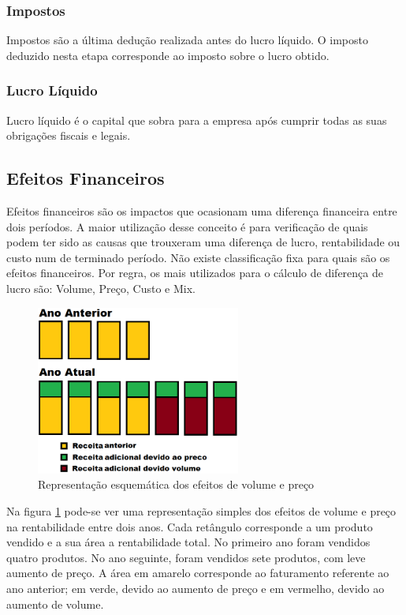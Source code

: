 \documentclass[12pt]{article}
\begin{document}
\subsubsection{Impostos}

	Impostos são a última dedução realizada antes do lucro líquido. O imposto deduzido nesta etapa corresponde ao imposto sobre o lucro obtido.

\subsubsection{Lucro Líquido}

	Lucro líquido é o capital que sobra para a empresa após cumprir todas as suas obrigações fiscais e legais.

\subsection{Efeitos Financeiros}

	Efeitos financeiros são os impactos que ocasionam uma diferença financeira entre dois períodos. A maior utilização desse conceito é para verificação de quais podem ter sido as causas que trouxeram uma diferença de lucro, rentabilidade ou custo num de terminado período. Não existe classificação fixa para quais são os efeitos financeiros. Por regra, os mais utilizados para o cálculo de diferença de lucro são: Volume, Preço, Custo e Mix.

\begin{figure}[h!]
	\centering
	\includegraphics[width=0.6\textwidth]{img/effects.png}
	\caption{Representação esquemática dos efeitos de volume e preço}
	\label{fig:effects}
\end{figure}

	Na figura \ref{fig:effects} pode-se ver uma representação simples dos efeitos de volume e preço na rentabilidade entre dois anos. Cada retângulo corresponde a um produto vendido e a sua área a rentabilidade total. No primeiro ano foram vendidos quatro produtos. No ano seguinte, foram vendidos sete produtos, com leve aumento de preço. A área em amarelo corresponde ao faturamento referente ao ano anterior; em verde, devido ao aumento de preço e em vermelho, devido ao aumento de volume.
\end{document}
